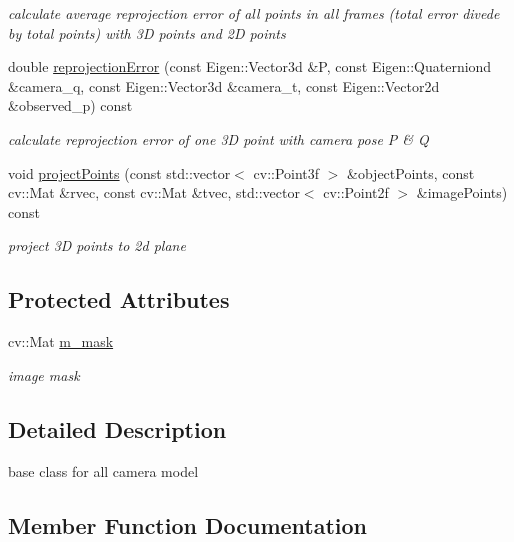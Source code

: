 \begin{DoxyCompactItemize}
\begin{DoxyCompactList}\small\item\em calculate average reprojection error of all points in all frames (total error divede by total points) with 3D points and 2D points \end{DoxyCompactList}\item 
double \hyperlink{classcamodocal_1_1Camera_ab261e28c2d056b3149275c01407416a3}{reprojection\+Error} (const Eigen\+::\+Vector3d \&P, const Eigen\+::\+Quaterniond \&camera\+\_\+q, const Eigen\+::\+Vector3d \&camera\+\_\+t, const Eigen\+::\+Vector2d \&observed\+\_\+p) const
\begin{DoxyCompactList}\small\item\em calculate reprojection error of one 3D point with camera pose P \& Q \end{DoxyCompactList}\item 
void \hyperlink{classcamodocal_1_1Camera_ab8dfa1aa8a60c5569920939ba7d85440}{project\+Points} (const std\+::vector$<$ cv\+::\+Point3f $>$ \&object\+Points, const cv\+::\+Mat \&rvec, const cv\+::\+Mat \&tvec, std\+::vector$<$ cv\+::\+Point2f $>$ \&image\+Points) const
\begin{DoxyCompactList}\small\item\em project 3D points to 2d plane \end{DoxyCompactList}\end{DoxyCompactItemize}
\subsection*{Protected Attributes}
\begin{DoxyCompactItemize}
\item 
\mbox{\label{classcamodocal_1_1Camera_a3c48cfb66f81f23bbce4cdbc02c64144}} 
cv\+::\+Mat \hyperlink{classcamodocal_1_1Camera_a3c48cfb66f81f23bbce4cdbc02c64144}{m\+\_\+mask}
\begin{DoxyCompactList}\small\item\em image mask \end{DoxyCompactList}\end{DoxyCompactItemize}


\subsection{Detailed Description}
base class for all camera model 

\subsection{Member Function Documentation}
\mbox{\label{classcamodocal_1_1Camera_a2a6d99ee0927e0336b4d77a9773900a4}} 

